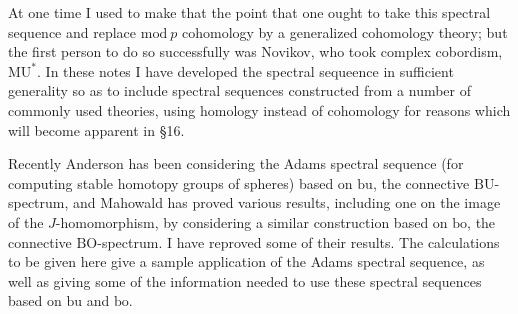 \documentclass[../main]{subfiles}
\begin{document}
At one time I used to make that the point that one ought to take this spectral sequence and replace $\mathrm{mod}\ p$ cohomology by a generalized cohomology theory; but the first person to do so successfully was Novikov, who took complex cobordism, $\mathrm{MU}^*$. In these notes I have developed the spectral sequeence in sufficient generality so as to include spectral sequences constructed from a number of commonly used theories, using homology instead of cohomology for reasons which will become apparent in \S 16.

Recently Anderson has been considering the Adams spectral sequence (for computing stable homotopy groups of spheres) based on $\mathrm{bu}$, the connective $\mathrm{BU}$-spectrum, and Mahowald has proved various results, including one on the image of the $J$-homomorphism, by considering a similar construction based on $\mathrm{bo}$, the connective $\mathrm{BO}$-spectrum. I have reproved some of their results. The calculations to be given here give a sample application of the Adams spectral sequence, as well as giving some of the information needed to use these spectral sequences based on $\mathrm{bu}$ and $\mathrm{bo}$.
\end{document}
